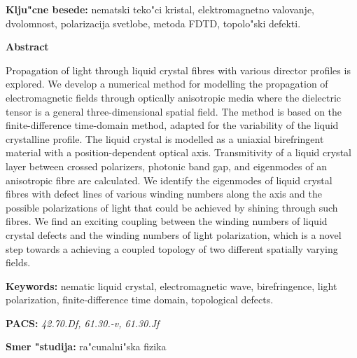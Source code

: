 \documentclass[12pt,twoside,openright,final,a4paper]{report}
\begin{document}
\bigskip
\noindent
{\bf Klju"cne besede:} nematski teko"ci kristal, elektromagnetno valovanje, dvolomnost, polarizacija svetlobe, metoda FDTD, topolo"ski defekti.

\bigskip
\bigskip

\vfill
\centerline{\bf Abstract}
\bigskip
\noindent

Propagation of light through liquid crystal fibres with various director profiles is explored. 
We develop a numerical method for modelling the propagation of electromagnetic fields through optically anisotropic media where the dielectric tensor is a general three-dimensional spatial field. 
The method is based on the finite-difference time-domain method, adapted for the variability of the liquid crystalline profile. 
The liquid crystal is modelled as a uniaxial birefringent material with a position-dependent optical axis. 
Transmitivity of a liquid crystal layer between crossed polarizers, photonic band gap, and eigenmodes of an anisotropic fibre are calculated. 
We identify the eigenmodes of liquid crystal fibres with defect lines of various winding numbers along the axis and the possible polarizations of light that could be achieved by shining through such fibres. 
We find an exciting coupling between the winding numbers of liquid crystal defects and the winding numbers of light polarization, which is a novel step towards a achieving a coupled topology of two different spatially varying fields.   

\bigskip
\noindent
{\bf Keywords:} nematic liquid crystal, electromagnetic wave, birefringence, light polarization, finite-difference time domain, topological defects.

\bigskip
\vfill

\noindent
{\bf PACS:} \textit{
42.70.Df, %
61.30.-v, %
61.30.Jf %
}

\bigskip
\vfill

\noindent
{\bf Smer "studija:} ra"cunalni"ska fizika
\vfill

\newpage

\thispagestyle{empty}
\quad

\newpage
\end{document}

